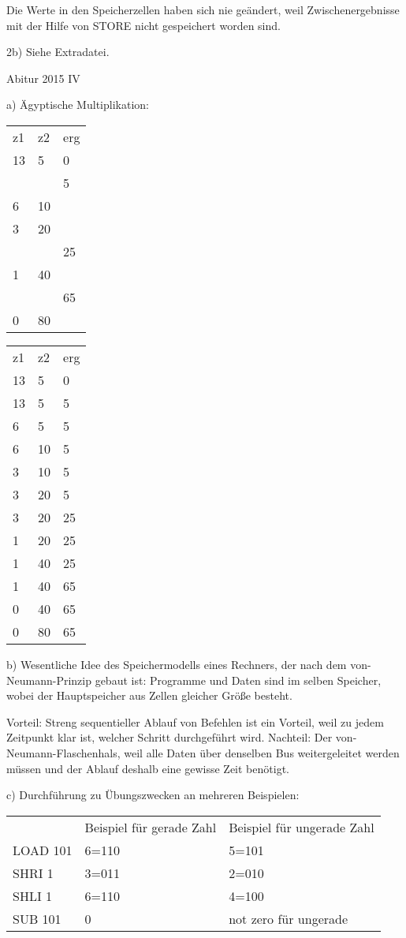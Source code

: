 \documentclass{lehramt-informatik-aufgabe}
\begin{document}
Die Werte in den Speicherzellen haben sich nie geändert, weil Zwischenergebnisse mit der Hilfe von STORE nicht gespeichert worden sind.

2b) Siehe Extradatei.

Abitur 2015 IV

a) Ägyptische Multiplikation:

\begin{tabular}{lll}
z1 & z2 & erg \\
13 & 5  & 0   \\
   &    & 5   \\
6  & 10 &     \\
3  & 20 &     \\
   &    & 25  \\
1  & 40 &     \\
   &    & 65  \\
0  & 80 &
\end{tabular}

\begin{tabular}{lll}
z1 & z2 & erg \\
13 & 5  & 0   \\
13 & 5  & 5   \\
6  & 5  & 5   \\
6  & 10 & 5   \\
3  & 10 & 5   \\
3  & 20 & 5   \\
3  & 20 & 25  \\
1  & 20 & 25  \\
1  & 40 & 25  \\
1  & 40 & 65  \\
0  & 40 & 65  \\
0  & 80 & 65
\end{tabular}

b)
Wesentliche Idee des Speichermodells eines Rechners, der nach dem von-Neumann-Prinzip gebaut ist:
Programme und Daten sind im selben Speicher, wobei der Hauptspeicher aus Zellen gleicher Größe besteht.

Vorteil:
Streng sequentieller Ablauf von Befehlen ist ein Vorteil, weil zu jedem Zeitpunkt klar ist, welcher Schritt durchgeführt wird.
Nachteil: Der von-Neumann-Flaschenhals, weil alle Daten über denselben Bus weitergeleitet werden müssen und der Ablauf deshalb eine gewisse Zeit benötigt.

c) Durchführung zu Übungszwecken an mehreren Beispielen:

\begin{tabular}{lll}
         & Beispiel für gerade 			Zahl & Beispiel für ungerade 			Zahl \\
LOAD 101 & 6=110                       & 5=101                         \\
SHRI 1   & 3=011                       & 2=010                         \\
SHLI 1   & 6=110                       & 4=100                         \\
SUB 101  & 0                           & not zero 			für ungerade
\end{tabular}
\end{document}
